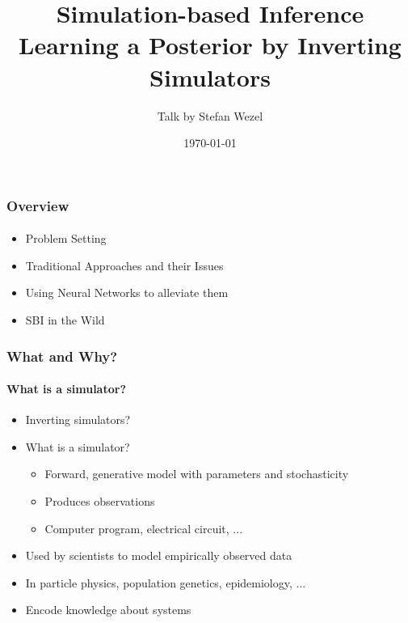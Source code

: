 \documentclass[9pt, aspectratio=169]{beamer}
\title{Simulation-based Inference \\
	\small Learning a Posterior by Inverting Simulators}
\author{Talk by Stefan Wezel}
\institute{mlcolab @ Tübingen University}
\date{\today}
\begin{document}
	

\begin{frame}[plain]
	\titlepage
\end{frame} 



\begin{frame}
\frametitle{Overview}
\framesubtitle{}
\begin{itemize}
	\item Problem Setting %
	\item Traditional Approaches and their Issues
	\item Using Neural Networks to alleviate them
	\item SBI in the Wild
\end{itemize}
\end{frame} 






\begin{frame}
\frametitle{What and Why?}
\framesubtitle{What is a simulator?}
\begin{itemize}
	\item Inverting simulators?%
	\item What is a simulator? %
	\begin{itemize}
		\item Forward, generative model with parameters and stochasticity
		\item Produces observations
		\item Computer program, electrical circuit, ...
	\end{itemize}
	\item Used by scientists to model empirically observed data
	\item In particle physics, population genetics, epidemiology, ...
	\item Encode knowledge about systems
\end{itemize}
\end{frame} 
\end{document}
